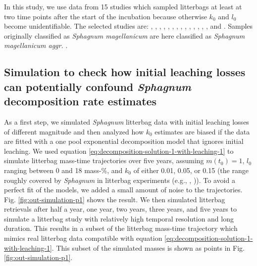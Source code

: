\documentclass[bg, manuscript]{copernicus}
\begin{document}
In this study, we use data from 15 studies which sampled litterbags at least at two time points after the start of the incubation because otherwise \(k_0\) and \(l_0\) become unidentifiable. The selected studies are: \citet{Bartsch.1985}, \citet{Vitt.1990}, \citet{Johnson.1991}, \citet{Szumigalski.1996}, \citet{Prevost.1997}, \citet{Scheffer.2001}, \citet{Thormann.2001}, \citet{Asada.2005b}, \citet{Trinder.2008}, \citet{Breeuwer.2008}, \citet{Strakova.2010}, \citet{Hagemann.2015}, \citet{Bengtsson.2017}, \citet{Golovatskaya.2017}, and \citet{Makila.2018}. Samples originally classified as \emph{Sphagnum magellanicum} are here classified as \emph{Sphagnum magellanicum aggr.} \citep{Hassel.2018}.

\subsection{\texorpdfstring{Simulation to check how initial leaching losses can potentially confound \emph{Sphagnum} decomposition rate estimates}{Simulation to check how initial leaching losses can potentially confound Sphagnum decomposition rate estimates}}

As a first step, we simulated \emph{Sphagnum} litterbag data with initial leaching losses of different magnitude and then analyzed how \(k_0\) estimates are biased if the data are fitted with a one pool exponential decomposition model that ignores initial leaching. We used equation \eqref{eq:decomposition-solution-1-with-leaching-1} to simulate litterbag mass-time trajectories over five years, assuming \(m(t_0)=1\), \(l_0\) ranging between 0 and 18 mass-\%, and \(k_0\) of either 0.01, 0.05, or 0.15 (the range roughly covered by \emph{Sphagnum} in litterbag experiments (e.g., \citet{Moore.2007}, \citet{Turetsky.2008})). To avoid a perfect fit of the models, we added a small amount of noise to the trajectories. Fig. \ref{fig:out-simulation-p1} shows the result. We then simulated litterbag retrievals after half a year, one year, two years, three years, and five years to simulate a litterbag study with relatively high temporal resolution and long duration. This results in a subset of the litterbag mass-time trajectory which mimics real litterbag data compatible with equation \eqref{eq:decomposition-solution-1-with-leaching-1}. This subset of the simulated masses is shown as points in Fig. \ref{fig:out-simulation-p1}.
\end{document}
